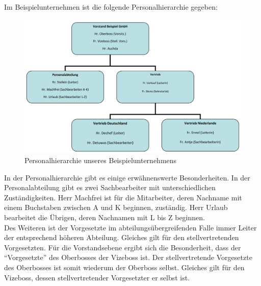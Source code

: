 Im Beispielunternehmen ist die folgende Personalhierarchie gegeben:
\begin{figure}[H]
\centering
\includegraphics[width=1.0\linewidth]{Bilder/Hierarchie}
\caption[]{Personalhierarchie unseres Beispielunternehmens\footnotemark}
\label{fig:Hierarchie}
\end{figure}

In der Personalhierarchie gibt es einige erwähnenswerte Besonderheiten. In der Personalabteilung gibt es zwei Sachbearbeiter mit unterschiedlichen Zuständigkeiten. Herr Machfrei ist für die Mitarbeiter, deren Nachname mit einem Buchstaben zwischen A und K beginnen, zuständig. Herr Urlaub bearbeitet die Übrigen, deren Nachnamen mit L bis Z beginnen.\\
Des Weiteren ist der Vorgesetzte im abteilungsübergreifenden Falle immer Leiter der entsprechend höheren Abteilung. Gleiches gilt für den stellvertretenden Vorgesetzten. Für die Vorstandsebene ergibt sich die Besonderheit, dass der "`Vorgesetzte"' des Oberbosses der Vizeboss ist.
Der stellvertretende Vorgesetzte des Oberbosses ist somit wiederum der Oberboss selbst. Gleiches gilt für den Vizeboss, dessen stellvertretender Vorgesetzter er selbst ist.



